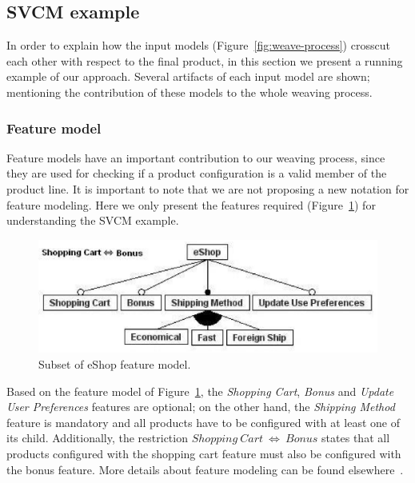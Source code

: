 \subsection{SVCM example}
\label{sub:running}

In order to explain how the input models (Figure~\ref{fig:weave-process})
crosscut each other with respect to the final product, in this section we
present a running example of our approach. Several artifacts of each input model
are shown; mentioning the contribution of these models to the whole weaving
process.

\subsubsection{Feature model}

Feature models have an important contribution to our
weaving process, since they are used for checking if a product
configuration is a valid member of the product line. It is important to note
that we are not proposing a new notation for feature modeling. Here we
only present the features required (Figure~\ref{fig:eshop-fm-re}) for
understanding the SVCM example.

\begin{figure}[h]
 \begin{center}
  \includegraphics[scale=0.40]{img/eShop-FM2.eps}
   \caption{Subset of eShop feature model.}
  \label{fig:eshop-fm-re}
  \end{center}
\end{figure}

Based on the feature model of Figure~\ref{fig:eshop-fm-re}, the \emph{Shopping
Cart}, \emph{Bonus} and \emph{Update User Preferences} features are optional; on
the other hand, the \emph{Shipping Method} feature is mandatory and all products
have to be configured with at least one of its child. Additionally, the
restriction $Shopping\ Cart\ \Leftrightarrow\ Bonus$ states that all
products configured with the shopping cart feature must also be configured with
the bonus feature. More details about feature modeling can be found
elsewhere~\cite{Gheyi:2006aa,Czarnecki:2000aa}.



